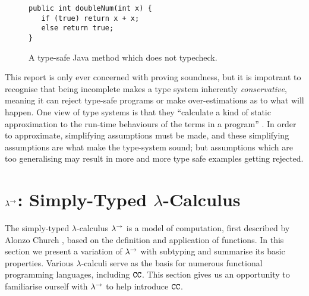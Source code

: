 \begin{figure}[h]
\vspace{-5pt}

\begin{lstlisting}
public int doubleNum(int x) {
   if (true) return x + x;
   else return true;
}
\end{lstlisting}
 
\vspace{-12pt}
\caption{A type-safe Java method which does not typecheck.}
\label{ref:java_typing_completeness}
\end{figure}

This report is only ever concerned with proving soundness, but it is impotrant to recognise that being incomplete makes a type system inherently \textit{conservative}, meaning it can reject type-safe programs or make over-estimations as to what will happen. One view of type systems is that they ``calculate a kind of static  approximation to the run-time behaviours of the terms in a program'' \cite[p. 2]{tapl}. In order to approximate, simplifying assumptions must be made, and these simplifying assumptions are what make the type-system sound; but assumptions which are too generalising may result in more and more type safe examples getting rejected.



\section{ $\lambda^{\rightarrow}$: Simply-Typed $\lambda$-Calculus}

The simply-typed $\lambda$-calculus $\lambda^{\rightarrow}$ is a model of computation, first described by Alonzo Church \cite{church40}, based on the definition and application of functions. In this section we present a variation of $\lambda^{\rightarrow}$ with subtyping and summarise its basic properties. Various $\lambda$-calculi serve as the basis for numerous functional programming languages, including $\mathtt{CC}$. This section gives us an opportunity to familiarise ourself with $\lambda^{\rightarrow}$ to help introduce $\mathtt{CC}$.

